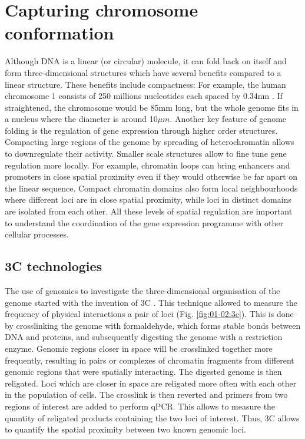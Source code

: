 \section{Capturing chromosome conformation}

Although DNA is a linear (or circular) molecule, it can fold back on itself and form three-dimensional structures which have several benefits compared to a linear structure. These benefits include compactness: For example, the human chromosome 1 consists of 250 millions nucleotides each spaced by 0.34nm \cite {langridgeMolecularConfigurationDeoxyribonucleic1960}. If straightened, the chromosome would be 85mm long, but the whole genome fits in a nucleus where the diameter is around 10$\mu m$. Another key feature of genome folding is the regulation of gene expression through higher order structures. Compacting large regions of the genome by spreading of \Gls{heterochromatin} allows to downregulate their activity. Smaller scale structures allow to fine tune gene regulation more locally. For example, \Gls{chromatin} loops can bring enhancers and promoters in close spatial proximity even if they would otherwise be far apart on the linear sequence. Compact chromatin domains also form local neighbourhoods where different loci are in close spatial proximity, while loci in distinct domains are isolated from each other. All these levels of spatial regulation are important to understand the coordination of the gene expression programme with other cellular processes.

\subsection{3C technologies}

The use of genomics to investigate the three-dimensional organisation of the genome started with the invention of \acrfull{3C} \cite{dekkerCapturingChromosomeConformation2002}. This technique allowed to measure the frequency of physical interactions a pair of loci (Fig. \ref{fig:01-02:3c}). This is done by crosslinking the genome with formaldehyde, which forms stable bonds between DNA and proteins, and subsequently digesting the genome with a restriction enzyme. Genomic regions closer in space will be crosslinked together more frequently, resulting in pairs or complexes of chromatin fragments from different genomic regions that were spatially interacting. The digested genome is then religated. Loci which are closer in space are religated more often with each other in the population of cells. The crosslink is then reverted and primers from two regions of interest are added to perform qPCR. This allows to measure the quantity of religated products containing the two loci of interest. Thus, 3C allows to quantify the spatial proximity between two known genomic loci.

